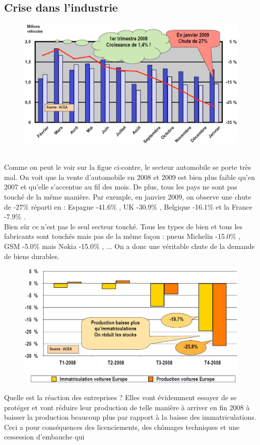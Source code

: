 \subsection{Crise dans l'industrie}

\begin{figure}
	\includegraphics[scale=0.3]{16}
\end{figure}
\ \\ Comme on peut le voir sur la figue ci-contre, le secteur automobile se porte très mal. On voit que la vente d'automobile en 2008 et 2009 est bien plus faible qu'en 2007 et qu'elle s'accentue au fil des mois. De plus, tous les pays ne sont pas touché de la même manière. Par exemple, en janvier 2009, on observe une chute de -27\% réparti en : Espagne -41.6\% , UK -30.9\% , Belgique -16.1\% et la France -7.9\% .\\
Bien sûr ce n'est pas le seul secteur touché. Tous les types de bien et tous les fabricants sont touchés mais pas de la même façon : pneus Michelin -15.0\% , GSM -5.0\% mais Nokia -15.0\% , ... On a donc une véritable chute de la demande de biens durables. 

\begin{figure}
	\includegraphics[scale=0.3]{17}
\end{figure}
Quelle est la réaction des entreprises ? Elles vont évidemment essayer de se protéger et vont réduire leur production de telle manière à arriver en fin 2008 à baisser la production beaucoup plus par rapport à la baisse des immatriculations. Ceci a pour conséquences des licenciements, des chômages techniques et une cessession d'embauche qui 


